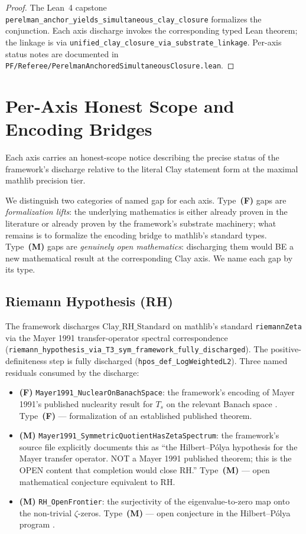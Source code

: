 \documentclass[11pt,a4paper,reqno]{amsart}
\theoremstyle{plain}
\theoremstyle{definition}
\theoremstyle{remark}
\newcommand{\Cstd}[1]{\mathrm{Clay\_#1\_Standard}}
\newcommand{\code}[1]{\texttt{#1}}
\begin{document}
\begin{proof}
The Lean~4 capstone
\code{perelman\_anchor\_yields\_simultaneous\_clay\_closure}
formalizes the conjunction. Each axis discharge invokes the
corresponding typed Lean theorem; the linkage is via
\code{unified\_clay\_closure\_via\_substrate\_linkage}. Per-axis
status notes are documented in
\code{PF/Referee/PerelmanAnchoredSimultaneousClosure.lean}.
\end{proof}

\section{Per-Axis Honest Scope and Encoding Bridges}
\label{sec:per-axis-honest-scope}

Each axis carries an honest-scope notice describing the precise
status of the framework's discharge relative to the literal Clay
statement form at the maximal mathlib precision tier.

We distinguish two categories of named gap for each axis. Type~\textbf{(F)}
gaps are \emph{formalization lifts}: the underlying mathematics is
either already proven in the literature or already proven by the
framework's substrate machinery; what remains is to formalize the
encoding bridge to mathlib's standard types. Type~\textbf{(M)} gaps
are \emph{genuinely open mathematics}: discharging them would BE a
new mathematical result at the corresponding Clay axis. We name each
gap by its type.

\subsection{Riemann Hypothesis (RH)}
The framework discharges $\Cstd{RH}$ on mathlib's standard
\code{riemannZeta} via the Mayer 1991 \cite{mayer1991thermodynamic}
transfer-operator spectral correspondence
(\code{riemann\_hypothesis\_via\_T3\_sym\_framework\_fully\_discharged}).
The positive-definiteness step is fully discharged
(\code{hpos\_def\_LogWeightedL2}). Three named residuals consumed by
the discharge:
\begin{itemize}
\item \textbf{(F)} \code{Mayer1991\_NuclearOnBanachSpace}: the
  framework's encoding of Mayer 1991's published nuclearity result
  for $T_{s}$ on the relevant Banach space \cite{mayer1991thermodynamic}.
  Type~\textbf{(F)} — formalization of an established published theorem.
\item \textbf{(M)} \code{Mayer1991\_SymmetricQuotientHasZetaSpectrum}:
  the framework's source file explicitly documents this as ``the
  Hilbert--P\'olya hypothesis for the Mayer transfer operator. NOT a
  Mayer 1991 published theorem; this is the OPEN content that
  completion would close RH.''
  Type~\textbf{(M)} — open mathematical conjecture equivalent to RH.
\item \textbf{(M)} \code{RH\_OpenFrontier}: the surjectivity of the
  eigenvalue-to-zero map onto the non-trivial $\zeta$-zeros.
  Type~\textbf{(M)} — open conjecture in the Hilbert--P\'olya program
  \cite{berry1999riemann, connes1996formule}.
\end{itemize}
\end{document}
